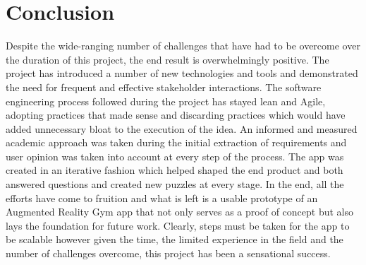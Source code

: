\documentclass{l4proj}
\begin{document}
\section{Conclusion}
Despite the wide-ranging number of challenges that have had to be overcome over the duration of this project, the end result is overwhelmingly positive. The project has introduced a number of new technologies and tools and demonstrated the need for frequent and effective stakeholder interactions. The software engineering process followed during the project has stayed lean and Agile, adopting practices that made sense and discarding practices which would have added unnecessary bloat to the execution of the idea. An informed and measured academic approach was taken during the initial extraction of requirements and user opinion was taken into account at every step of the process. The app was created in an iterative fashion which helped shaped the end product and both answered questions and created new puzzles at every stage. In the end, all the efforts have come to fruition and what is left is a usable prototype of an Augmented Reality Gym app that not only serves as a proof of concept but also lays the foundation for future work. Clearly, steps must be taken for the app to be scalable however given the time, the limited experience in the field and the number of challenges overcome, this project has been a sensational success. 
\end{document}
